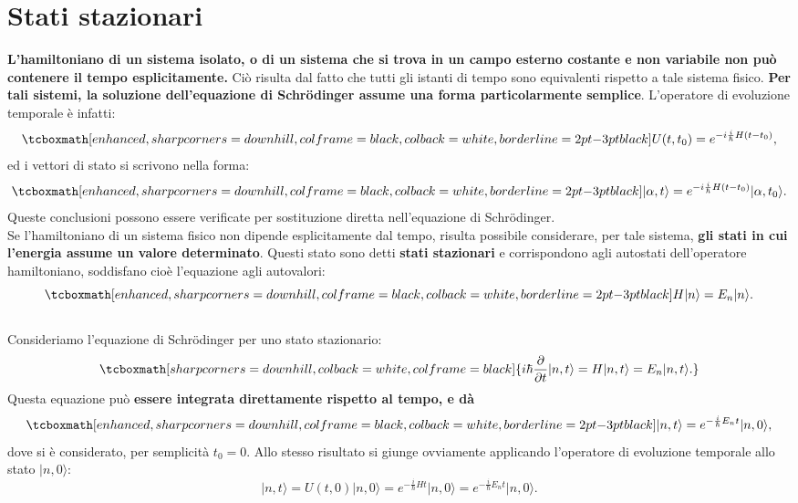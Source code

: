 \section[Stati stazionari]{Stati stazionari}
\textbf{L'hamiltoniano di un sistema isolato, o di un sistema che si trova in un campo esterno costante e non variabile non può contenere il tempo esplicitamente.} Ciò risulta dal fatto che tutti gli istanti di tempo sono equivalenti rispetto a tale sistema fisico. \textbf{Per tali sistemi, la soluzione dell'equazione di Schr\"{o}dinger assume una forma particolarmente semplice}. L'operatore di evoluzione temporale è infatti:
	\begin{equation}
		\tcboxmath[enhanced, sharp corners=downhill, colframe=black, colback=white, borderline={2pt}{-3pt}{black}]{
		U(t,t_0)= e^{-i\frac{i}{\hbar}H(t-t_0)},
		}
	\end{equation}
ed i vettori di stato si scrivono nella forma:
	\begin{equation}
		\tcboxmath[enhanced, sharp corners=downhill, colframe=black, colback=white, borderline={2pt}{-3pt}{black}]{
			\vert \alpha, t \rangle = e^{-i\frac{i}{\hbar}H(t-t_0)}\vert \alpha, t_0 \rangle.
			}
	\end{equation}
Queste conclusioni possono essere verificate per sostituzione diretta nell'equazione di Schr\"{o}dinger.\\

Se l'hamiltoniano di un sistema fisico non dipende esplicitamente dal tempo, risulta possibile considerare, per tale sistema, \textbf{gli stati in cui l'energia assume un valore determinato}. Questi stato sono detti \textbf{stati stazionari} e corrispondono agli autostati dell'operatore hamiltoniano, soddisfano cioè l'equazione agli autovalori:
	\begin{equation}
		\tcboxmath[enhanced, sharp corners=downhill, colframe=black, colback=white, borderline={2pt}{-3pt}{black}]{
			H|n\rangle = E_n |n \rangle.
			}
	\end{equation}\\
	
Consideriamo l'equazione di Schr\"{o}dinger per uno stato stazionario:
	\begin{equation}
		\tcboxmath[sharp corners=downhill, colback=white, colframe=black]{
			i\hbar \frac{\partial}{\partial t}|n,t\rangle = H |n,t \rangle = E_n |n, t \rangle.
			}
	\end{equation}
Questa equazione può \textbf{essere integrata direttamente rispetto al tempo, e dà}
	\begin{equation}
		\tcboxmath[enhanced, sharp corners=downhill, colframe=black, colback=white, borderline={2pt}{-3pt}{black}]{	
			|n,t\rangle = e^{-\frac{i}{\hbar}E_n t}\vert n, 0\rangle,
			}
	\label{eq:cap8_4}
	\end{equation}
dove si è considerato, per semplicità $t_0=0$. Allo stesso risultato si giunge ovviamente applicando l'operatore di evoluzione temporale allo stato $\vert n, 0\rangle$:
	\begin{equation}
		\vert n, t \rangle = U(t,0) \vert n, 0 \rangle = e^{-\frac{i}{\hbar}H t}\vert n, 0\rangle= e^{-\frac{i}{\hbar}E_n t}\vert n, 0\rangle.
	\end{equation}\\

